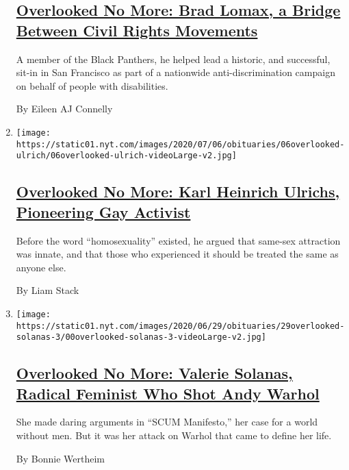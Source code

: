 \begin{enumerate}
{  \subsection{\texorpdfstring{\href{/2020/07/08/obituaries/brad-lomax-overlooked.html}{Overlooked
  No More: Brad Lomax, a Bridge Between Civil Rights
  Movements}}{Overlooked No More: Brad Lomax, a Bridge Between Civil Rights Movements}}\label{overlooked-no-more-brad-lomax-a-bridge-between-civil-rights-movements}}

  A member of the Black Panthers, he helped lead a historic, and
  successful, sit-in in San Francisco as part of a nationwide
  anti-discrimination campaign on behalf of people with disabilities.

  By Eileen AJ Connelly
\item
  \texttt{[image: https://static01.nyt.com/images/2020/07/06/obituaries/06overlooked-ulrich/06overlooked-ulrich-videoLarge-v2.jpg]}

  \hypertarget{overlooked-no-more-karl-heinrich-ulrichs-pioneering-gay-activist}{%
  \subsection{\texorpdfstring{\href{/2020/07/01/obituaries/karl-heinrich-ulrichs-overlooked.html}{Overlooked
  No More: Karl Heinrich Ulrichs, Pioneering Gay
  Activist}}{Overlooked No More: Karl Heinrich Ulrichs, Pioneering Gay Activist}}\label{overlooked-no-more-karl-heinrich-ulrichs-pioneering-gay-activist}}

  Before the word ``homosexuality'' existed, he argued that same-sex
  attraction was innate, and that those who experienced it should be
  treated the same as anyone else.

  By Liam Stack
\item
  \texttt{[image: https://static01.nyt.com/images/2020/06/29/obituaries/29overlooked-solanas-3/00overlooked-solanas-3-videoLarge-v2.jpg]}

  \hypertarget{overlooked-no-more-valerie-solanas-radical-feminist-who-shot-andy-warhol}{%
  \subsection{\texorpdfstring{\href{/2020/06/26/obituaries/valerie-solanas-overlooked.html}{Overlooked
  No More: Valerie Solanas, Radical Feminist Who Shot Andy
  Warhol}}{Overlooked No More: Valerie Solanas, Radical Feminist Who Shot Andy Warhol}}\label{overlooked-no-more-valerie-solanas-radical-feminist-who-shot-andy-warhol}}

  She made daring arguments in ``SCUM Manifesto,'' her case for a world
  without men. But it was her attack on Warhol that came to define her
  life.

  By Bonnie Wertheim
\end{enumerate}

